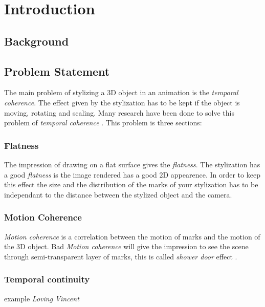 \chapter{Introduction}


\section{Background}

\section{Problem Statement}

The main problem of stylizing a 3D object in an animation is the \textit{temporal coherence}. The effect given by the stylization has to be kept if the object is moving, rotating and scaling. Many research have been done to solve this problem of \textit{temporal coherence} \cite{vergne_implicit_2011, benard_dynamic_2009, bleron_motion-coherent_2018}. This problem is three sections:

\subsection{Flatness}

The impression of drawing on a flat surface gives the \textit{flatness}. The stylization has a good \textit{flatness} is the image rendered has a good 2D appearence. In order to keep this effect the size and the distribution of the marks of your stylization has to be independant to the distance between the stylized object and the camera.

\subsection{Motion Coherence}

\textit{Motion coherence} is a correlation between the motion of marks and the motion of the 3D object. Bad \textit{Motion coherence} will give the impression to see the scene through semi-transparent layer of marks, this is called \textit{shower door} effect \cite{meier_painterly_1996}.

\subsection{Temporal continuity}


example \textit{Loving Vincent}
